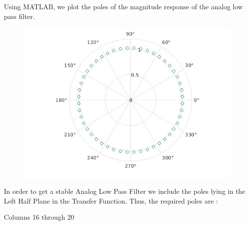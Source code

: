 \documentclass{article}
\begin{document}
Using MATLAB, we plot the poles of the magnitude response of the analog low pass filter.
\begin{figure}[h!]
    \centering
    \includegraphics[scale = 0.5]{poles_bsf.jpg}
    \caption{}
    \label{fig:my_label}
\end{figure}
In order to get a stable Analog Low Pass Filter we include the poles lying in the Left Half Plane in the Transfer Function. Thus, the required poles are :
        


  Columns 16 through 20

  

  
\end{document}
